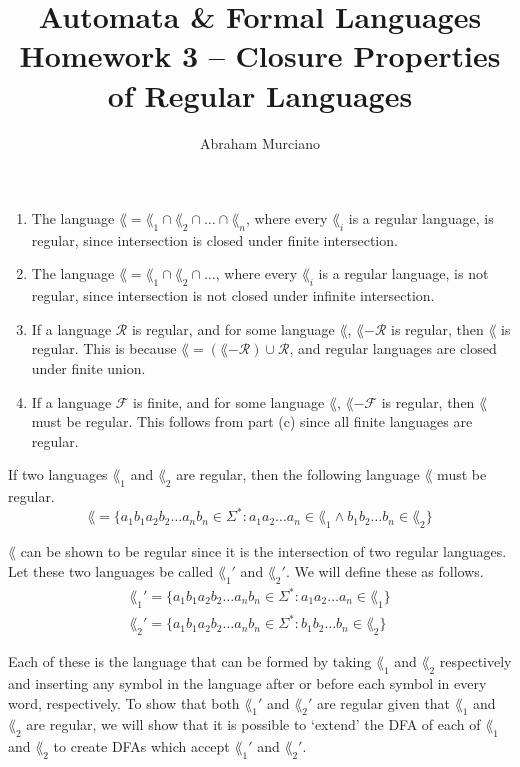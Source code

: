 \documentclass[fleqn]{article}
\title{Automata \& Formal Languages \\
\medskip
\large Homework 3 -- Closure Properties of Regular Languages}
\author{Abraham Murciano}
\begin{document}
\maketitle

\begin{answers}

	\item %
	\begin{enumerate}
		\item %
		The language \(\lang = \lang_1 \cap \lang_2 \cap \dots \cap \lang_n\), where every \(\lang_i\) is a regular language, is regular, since intersection is closed under finite intersection.

		\item %
		The language \(\lang = \lang_1 \cap \lang_2 \cap \dots\), where every \(\lang_i\) is a regular language, is not regular, since intersection is not closed under infinite intersection.

		\item %
		If a language \(\mathcal{R}\) is regular, and for some language \(\lang\), \(\lang - \mathcal{R}\) is regular, then \(\lang\) is regular. This is because \(\lang = (\lang - \mathcal{R}) \cup \mathcal{R}\), and regular languages are closed under finite union.

		\item %
		If a language \(\mathcal{F}\) is finite, and for some language \(\lang\), \(\lang - \mathcal{F}\) is regular, then \(\lang\) must be regular. This follows from part (c) since all finite languages are regular.
	\end{enumerate}

	\item %
	If two languages \(\lang_1\) and \(\lang_2\) are regular, then the following language \(\lang\) must be regular.
	\[\lang = \{a_1 b_1 a_2 b_2 \dots a_n b_n \in \Sigma^* : a_1 a_2 \dots a_n \in \lang_1 \land b_1 b_2 \dots b_n \in \lang_2\}\]

	\(\lang\) can be shown to be regular since it is the intersection of two regular languages. Let these two languages be called \(\lang_1'\) and \(\lang_2'\). We will define these as follows.
	\begin{gather*}
		\lang_1' = \{a_1 b_1 a_2 b_2 \dots a_n b_n \in \Sigma^* : a_1 a_2 \dots a_n \in \lang_1\} \\
		\lang_2' = \{a_1 b_1 a_2 b_2 \dots a_n b_n \in \Sigma^* : b_1 b_2 \dots b_n \in \lang_2\}
	\end{gather*}

	Each of these is the language that can be formed by taking \(\lang_1\) and \(\lang_2\) respectively and inserting any symbol in the language after or before each symbol in every word, respectively. To show that both \(\lang_1'\) and \(\lang_2'\) are regular given that \(\lang_1\) and \(\lang_2\) are regular, we will show that it is possible to `extend' the DFA of each of \(\lang_1\) and \(\lang_2\) to create DFAs which accept \(\lang_1'\) and \(\lang_2'\).


\end{answers}
\end{document}
